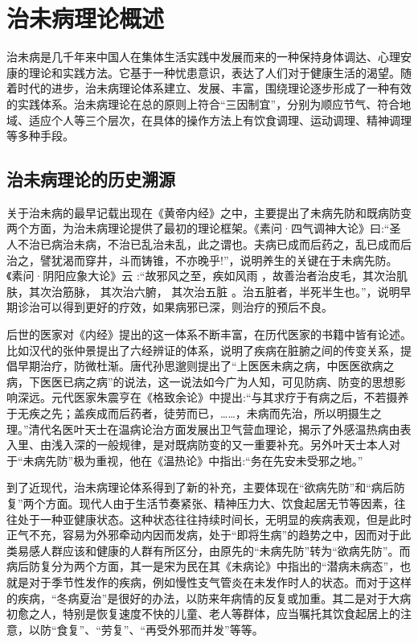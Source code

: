 \section{治未病理论概述}
治未病是几千年来中国人在集体生活实践中发展而来的一种保持身体调达、心理安康的理论和实践方法。它基于一种忧患意识，表达了人们对于健康生活的渴望。随着时代的进步，治未病理论体系建立、发展、丰富，围绕理论逐步形成了一种有效的实践体系。治未病理论在总的原则上符合“三因制宜”，分别为顺应节气、符合地域、适应个人等三个层次，在具体的操作方法上有饮食调理、运动调理、精神调理等多种手段。

\subsection{治未病理论的历史溯源}
关于治未病的最早记载出现在《黄帝内经》之中，主要提出了未病先防和既病防变两个方面，为治未病理论提供了最初的理论框架。《素问·四气调神大论》曰:“圣人不治已病治未病，不治已乱治未乱，此之谓也。夫病已成而后药之，乱已成而后治之，譬犹渴而穿井，斗而铸锥，不亦晚乎!”\cite{南京中医学院医经教研组1981黄帝内经素问译释}，说明养生的关键在于未病先防。《素问·阴阳应象大论》云 :“故邪风之至，疾如风雨 ，故善治者治皮毛，其次治肌肤，其次治筋脉， 其次治六腑， 其次治五脏 。治五脏者，半死半生也。”\cite{南京中医学院医经教研组1981黄帝内经素问译释}，说明早期诊治可以得到更好的疗效，如果病邪已深，则治疗的预后不良。

后世的医家对《内经》提出的这一体系不断丰富，在历代医家的书籍中皆有论述。比如汉代的张仲景提出了六经辨证的体系，说明了疾病在脏腑之间的传变关系，提倡早期治疗，防微杜渐。唐代孙思邈则提出了“上医医未病之病，中医医欲病之病，下医医已病之病”\cite{李俊德2008中医必读百部名著}的说法，这一说法如今广为人知，可见防病、防变的思想影响深远。元代医家朱震亨在《格致余论》中提出:“与其求疗于有病之后，不若摄养于无疾之先；盖疾成而后药者，徒劳而已，……，未病而先治，所以明摄生之理。”\cite{朱震亨2008格致余论}清代名医叶天士在温病论治方面发展出卫气营血理论，揭示了外感温热病由表入里、由浅入深的一般规律，是对既病防变的又一重要补充。另外叶天士本人对于“未病先防”极为重视，他在《温热论》中指出:“务在先安未受邪之地。”\cite{叶桂2007温热论}

到了近现代，治未病理论体系得到了新的补充，主要体现在“欲病先防”和“病后防复”两个方面。现代人由于生活节奏紧张、精神压力大、饮食起居无节等因素，往往处于一种亚健康状态。这种状态往往持续时间长，无明显的疾病表观，但是此时正气不充，容易为外邪牵动内因而发病，处于“即将生病”的趋势之中，因而对于此类易感人群应该和健康的人群有所区分，由原先的“未病先防”转为“欲病先防”。而病后防复分为两个方面，其一是宋为民在其《未病论》\cite{宋为民1992未病论}中指出的“潜病未病态”，也就是对于季节性发作的疾病，例如慢性支气管炎在未发作时人的状态。而对于这样的疾病，“冬病夏治”是很好的办法，以防来年病情的反复或加重。其二是对于大病初愈之人，特别是恢复速度不快的儿童、老人等群体，应当嘱托其饮食起居上的注意，以防“食复”、“劳复”、“再受外邪而并发”等等。


